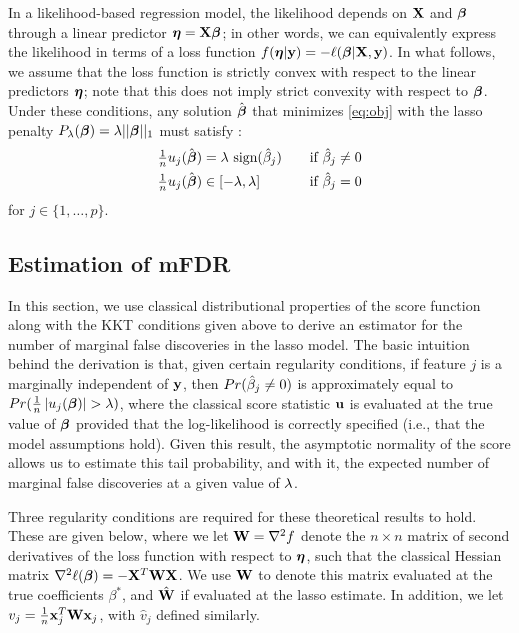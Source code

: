 In a likelihood-based regression model, the likelihood depends on $\mathbf{X}$ and $\boldsymbol{\beta}$ through a linear predictor $\boldsymbol{\eta} = \mathbf{X}\boldsymbol{\beta}$; in other words, we can equivalently express the likelihood in terms of a loss function $f(\boldsymbol{\eta}|\mathbf{y})=-\ell(\boldsymbol{\beta}|\mathbf{X},\mathbf{y})$.
In what follows, we assume that the loss function is strictly convex with respect to the linear predictors $\boldsymbol{\eta}$; note that this does not imply strict convexity with respect to $\boldsymbol{\beta}$.
Under these conditions, any solution $\hat{\boldsymbol{\beta}}$ that minimizes \eqref{eq:obj} with the lasso penalty $P_{\lambda} (\boldsymbol{\beta}) = \lambda||\boldsymbol{\beta}||_1$ must satisfy \citep{lasso_kkt}:
\begin{alignat*}{2}
  \tfrac{1}{n}u_j(\hat{\boldsymbol{\beta}}) &= \lambda \textrm{ sign}(\hat{\beta}_j) &\quad \text{if } \hat{\beta}_j &\neq 0 \\
  \tfrac{1}{n}u_j(\hat{\boldsymbol{\beta}}) &\in [-\lambda,\lambda]  &\quad \text{if }  \hat{\beta}_j &= 0
\end{alignat*}
for $j \in \{1, \ldots, p\}$.


\subsection{Estimation of mFDR}

In this section, we use classical distributional properties of the score function along with the KKT conditions given above to derive an estimator for the number of marginal false discoveries in the lasso model.
The basic intuition behind the derivation is that, given certain regularity conditions, if feature $j$ is a marginally independent of $\mathbf{y}$, then $Pr(\hat{\beta}_j \neq 0)$ is approximately equal to $Pr(\tfrac{1}{n}\left\lvert u_j(\boldsymbol{\beta})\right\rvert > \lambda)$, where the classical score statistic $\mathbf{u}$ is evaluated at the true value of $\boldsymbol{\beta}$ provided that the log-likelihood is correctly specified (i.e., that the model assumptions hold).
Given this result, the asymptotic normality of the score allows us to estimate this tail probability, and with it, the expected number of marginal false discoveries at a given value of $\lambda$.

Three regularity conditions are required for these theoretical results to hold.  These are given below, where we let $\mathbf{W} = \nabla^2f$ denote the $n \times n$ matrix of second derivatives of the loss function with respect to $\boldsymbol{\eta}$, such that the classical Hessian matrix $\nabla^2 \ell (\boldsymbol{\beta}) = -\mathbf{X}^T\mathbf{W}\mathbf{X}$.  We use $\mathbf{W}$ to denote this matrix evaluated at the true coefficients $\beta^*$, and $\hat{\mathbf{W}}$ if evaluated at the lasso estimate.  In addition, we let $v_j=\frac{1}{n}\mathbf{x}_j^T\mathbf{W}\mathbf{x}_j$, with $\hat{v}_j$ defined similarly.

